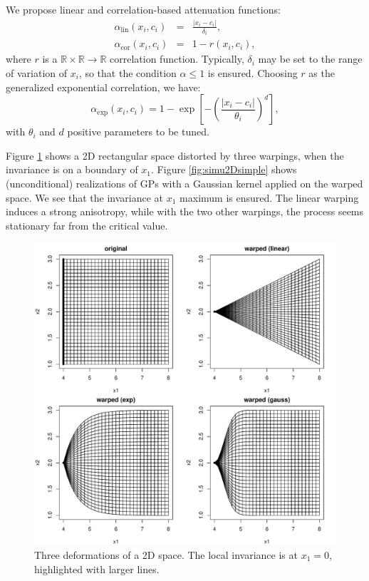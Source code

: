 \documentclass[a4paper,10pt]{article}
\newcommand{\Rset}{\mathbb{R}}
\begin{document}
We propose linear and correlation-based attenuation functions: 
\begin{eqnarray}
 \alpha_\text{lin}(x_i, c_i) &=& \frac{\lvert x_i - c_i \rvert}{\delta_i}, \\
 \alpha_\text{cor}(x_i, c_i) &=& 1 - r(x_i, c_i),
\end{eqnarray}
where $r$ is a $\Rset \times \Rset\rightarrow \Rset$ correlation function.
Typically, $\delta_i$ may be set to the range of variation of $x_i$, so that the condition $\alpha \leq 1$ is ensured.
Choosing $r$ as the generalized exponential correlation, we have:
\begin{equation}
   \alpha_\text{exp}(x_i, c_i) = 1 - \exp \left[ - \left(\frac{\lvert x_i - c_i \rvert}{\theta_i}\right)^d \right],
\end{equation}
with $\theta_i$ and $d$ positive parameters to be tuned. 

Figure \ref{fig:3defsimple} shows a 2D rectangular space distorted by three warpings, when the invariance is on a boundary of $x_1$.
Figure \ref{fig:simu2Dsimple} shows (unconditional) realizations of GPs with a Gaussian kernel applied on the warped space. 
We see that the invariance at $x_1$ maximum is ensured. The linear warping induces a strong anisotropy, while with the two other warpings,
the process seems stationary far from the critical value.

\begin{figure}[!ht]
\centering
 \includegraphics[width=.8\textwidth]{def2Dsimple.pdf}
 \caption{Three deformations of a 2D space. The local invariance is at $x_1=0$, highlighted with larger lines.}\label{fig:3defsimple}
\end{figure}
\end{document}
